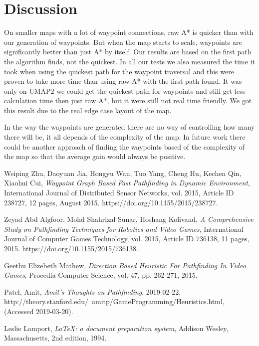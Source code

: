 \documentclass[a4paper]{article}
\begin{document}
\section{Discussion}
On smaller maps with a lot of waypoint connections, raw A* is quicker than with our generation of waypoints. But when the map starts to scale, waypoints are significantly better than just A* by itself.
Our results are based on the first path the algorithm finds, not the quickest. In all our tests we also measured the time it took when using the quickest path for the waypoint traversal and this were proven to take more time than using raw A* with the first path found. It was only on UMAP2 we could get the quickest path for waypoints and still get less calculation time then just raw A*, but it were still not real time friendly. We got this result due to the real edge case layout of the map.
	
In the way the waypoints are generated there are no way of controlling how many there will be, it all depends of the complexity of the map. In future work there could be another approach of finding the waypoints based of the complexity of the map so that the average gain would always be positive.

\newpage
\begin{thebibliography}{9}

  Weiping Zhu, Daoyuan Jia, Hongyu Wan, Tuo Yang, Cheng Hu, Kechen Qin, Xiaohui Cui,
  \textit{Waypoint Graph Based Fast Pathfinding in Dynamic Environment},
  International Journal of Distributed Sensor Networks, vol. 2015, Article ID 238727, 12 pages,
  August 2015. https://doi.org/10.1155/2015/238727.

  Zeyad Abd Algfoor, Mohd Shahrizal Sunar, Hoshang Kolivand,
  \textit{A Comprehensive Study on Pathfinding Techniques for Robotics and Video Games},
  International Journal of Computer Games Technology, vol. 2015, Article ID 736138, 11 pages,
  2015. https://doi.org/10.1155/2015/736138.

  Geethu Elizebeth Mathew,
  \textit{Direction Based Heuristic For Pathfinding In Video Games},
  Procedia Computer Science, vol. 47, pp. 262-271,
  2015.

   Patel, Amit,
  \textit{Amit's Thoughts on Pathfinding},
  2019-02-22,
  http://theory.stanford.edu/~amitp/GameProgramming/Heuristics.html,
  (Accessed 2019-03-20).

  Leslie Lamport,
  \textit{\LaTeX: a document preparation system},
  Addison Wesley, Massachusetts,
  2nd edition,
  1994.

\end{thebibliography}
\end{document}
